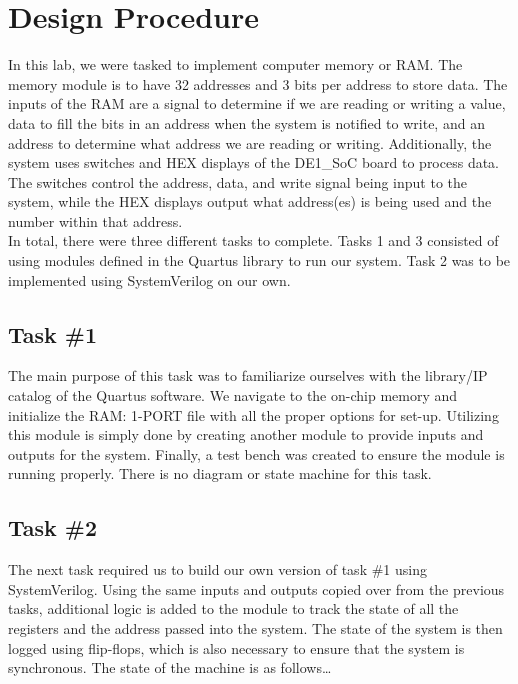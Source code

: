 \documentclass[11pt, titlepage]{article}
\author{Cameron Jennings (ID: 2029631), Donovan Clay (ID: 2276005)}
\title{\assignmentname}
\date{\parbox{\linewidth}{\centering
\experimentDate
  \endgraf\bigskip
  \className\
}}
\begin{document}
	\maketitle
 
    \setcounter{tocdepth}{2}
    \begin{center}
        \tableofcontents\label{beginning}
    \end{center}
    \newpage
    
    \section{Design Procedure}
    In this lab, we were tasked to implement computer memory or RAM. The memory module is to have 32 addresses and 3 bits per address to store data. The inputs of the RAM are a signal to determine if we are reading or writing a value, data to fill the bits in an address when the system is notified to write, and an address to determine what address we are reading or writing. Additionally, the system uses switches and HEX displays of the DE1\_SoC board to process data. The switches control the address, data, and write signal being input to the system, while the HEX displays output what address(es) is being used and the number within that address. \\

    In total, there were three different tasks to complete. Tasks 1 and 3 consisted of using modules defined in the Quartus library to run our system. Task 2 was to be implemented using SystemVerilog on our own. \\
    
        \subsection{Task \#1}
            The main purpose of this task was to familiarize ourselves with the library/IP catalog of the Quartus software. We navigate to the on-chip memory and initialize the RAM: 1-PORT file with all the proper options for set-up. Utilizing this module is simply done by creating another module to provide inputs and outputs for the system. Finally, a test bench was created to ensure the module is running properly. There is no diagram or state machine for this task.

        \subsection{Task \#2}
            The next task required us to build our own version of task \#1 using SystemVerilog. Using the same inputs and outputs copied over from the previous tasks, additional logic is added to the module to track the state of all the registers and the address passed into the system. The state of the system is then logged using flip-flops, which is also necessary to ensure that the system is synchronous. The state of the machine is as follows\dots\\
\end{document}
